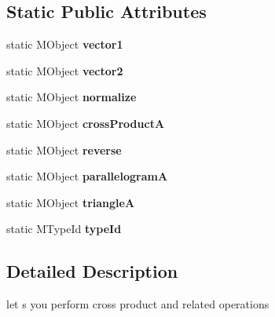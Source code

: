 \subsection*{Static Public Attributes}
\begin{DoxyCompactItemize}
\item 
\hypertarget{class_m_g__cross_product_a168a1bd8516dcdd48b7b411690e4ace1}{static M\-Object {\bfseries vector1}}\label{class_m_g__cross_product_a168a1bd8516dcdd48b7b411690e4ace1}

\item 
\hypertarget{class_m_g__cross_product_a02537162bdc9d36081799eb510bf5e33}{static M\-Object {\bfseries vector2}}\label{class_m_g__cross_product_a02537162bdc9d36081799eb510bf5e33}

\item 
\hypertarget{class_m_g__cross_product_a90700f4d43108bdfba82432a76d8eda9}{static M\-Object {\bfseries normalize}}\label{class_m_g__cross_product_a90700f4d43108bdfba82432a76d8eda9}

\item 
\hypertarget{class_m_g__cross_product_adbedd1ca22359e0ef993e18b5fd7bb55}{static M\-Object {\bfseries cross\-Product\-A}}\label{class_m_g__cross_product_adbedd1ca22359e0ef993e18b5fd7bb55}

\item 
\hypertarget{class_m_g__cross_product_a89b59a4e0255cfdb96b3d235ff9cb0ef}{static M\-Object {\bfseries reverse}}\label{class_m_g__cross_product_a89b59a4e0255cfdb96b3d235ff9cb0ef}

\item 
\hypertarget{class_m_g__cross_product_ae04ffba8f459592e3ee0128a8bb36576}{static M\-Object {\bfseries parallelogram\-A}}\label{class_m_g__cross_product_ae04ffba8f459592e3ee0128a8bb36576}

\item 
\hypertarget{class_m_g__cross_product_ad12d96fd5106cddf312b04c468ef36f9}{static M\-Object {\bfseries triangle\-A}}\label{class_m_g__cross_product_ad12d96fd5106cddf312b04c468ef36f9}

\item 
\hypertarget{class_m_g__cross_product_a9947b42b254eb4c86f8d190a3652ceea}{static M\-Type\-Id {\bfseries type\-Id}}\label{class_m_g__cross_product_a9947b42b254eb4c86f8d190a3652ceea}

\end{DoxyCompactItemize}


\subsection{Detailed Description}
let s you perform cross product and related operations 

